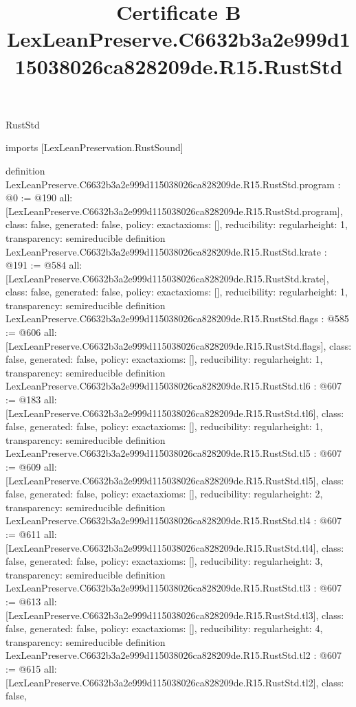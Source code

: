 \begin{lexlean}{RustStd}
\title{Certificate B LexLeanPreserve.C6632b3a2e999d115038026ca828209de.R15.RustStd}
\begin{coremodule}
imports [LexLeanPreservation.RustSound]

definition LexLeanPreserve.C6632b3a2e999d115038026ca828209de.R15.RustStd.program : @0 := @190 {
  all: [LexLeanPreserve.C6632b3a2e999d115038026ca828209de.R15.RustStd.program],
  class: false,
  generated: false,
  policy: exact{axioms: []},
  reducibility: regular{height: 1},
  transparency: semireducible
}
definition LexLeanPreserve.C6632b3a2e999d115038026ca828209de.R15.RustStd.krate : @191 := @584 {
  all: [LexLeanPreserve.C6632b3a2e999d115038026ca828209de.R15.RustStd.krate],
  class: false,
  generated: false,
  policy: exact{axioms: []},
  reducibility: regular{height: 1},
  transparency: semireducible
}
definition LexLeanPreserve.C6632b3a2e999d115038026ca828209de.R15.RustStd.flags : @585 := @606 {
  all: [LexLeanPreserve.C6632b3a2e999d115038026ca828209de.R15.RustStd.flags],
  class: false,
  generated: false,
  policy: exact{axioms: []},
  reducibility: regular{height: 1},
  transparency: semireducible
}
definition LexLeanPreserve.C6632b3a2e999d115038026ca828209de.R15.RustStd.tl6 : @607 := @183 {
  all: [LexLeanPreserve.C6632b3a2e999d115038026ca828209de.R15.RustStd.tl6],
  class: false,
  generated: false,
  policy: exact{axioms: []},
  reducibility: regular{height: 1},
  transparency: semireducible
}
definition LexLeanPreserve.C6632b3a2e999d115038026ca828209de.R15.RustStd.tl5 : @607 := @609 {
  all: [LexLeanPreserve.C6632b3a2e999d115038026ca828209de.R15.RustStd.tl5],
  class: false,
  generated: false,
  policy: exact{axioms: []},
  reducibility: regular{height: 2},
  transparency: semireducible
}
definition LexLeanPreserve.C6632b3a2e999d115038026ca828209de.R15.RustStd.tl4 : @607 := @611 {
  all: [LexLeanPreserve.C6632b3a2e999d115038026ca828209de.R15.RustStd.tl4],
  class: false,
  generated: false,
  policy: exact{axioms: []},
  reducibility: regular{height: 3},
  transparency: semireducible
}
definition LexLeanPreserve.C6632b3a2e999d115038026ca828209de.R15.RustStd.tl3 : @607 := @613 {
  all: [LexLeanPreserve.C6632b3a2e999d115038026ca828209de.R15.RustStd.tl3],
  class: false,
  generated: false,
  policy: exact{axioms: []},
  reducibility: regular{height: 4},
  transparency: semireducible
}
definition LexLeanPreserve.C6632b3a2e999d115038026ca828209de.R15.RustStd.tl2 : @607 := @615 {
  all: [LexLeanPreserve.C6632b3a2e999d115038026ca828209de.R15.RustStd.tl2],
  class: false,
}
\end{coremodule}
\end{lexlean}
